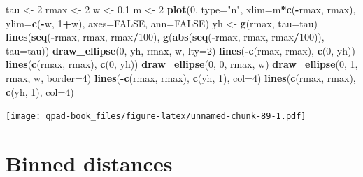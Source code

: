 \documentclass[12pt,]{book}
\newenvironment{Shaded}{\begin{snugshade}}{\end{snugshade}}
\newcommand{\DataTypeTok}[1]{\textcolor[rgb]{0.13,0.29,0.53}{#1}}
\newcommand{\DecValTok}[1]{\textcolor[rgb]{0.00,0.00,0.81}{#1}}
\newcommand{\FloatTok}[1]{\textcolor[rgb]{0.00,0.00,0.81}{#1}}
\newcommand{\KeywordTok}[1]{\textcolor[rgb]{0.13,0.29,0.53}{\textbf{#1}}}
\newcommand{\NormalTok}[1]{#1}
\newcommand{\OperatorTok}[1]{\textcolor[rgb]{0.81,0.36,0.00}{\textbf{#1}}}
\newcommand{\OtherTok}[1]{\textcolor[rgb]{0.56,0.35,0.01}{#1}}
\newcommand{\StringTok}[1]{\textcolor[rgb]{0.31,0.60,0.02}{#1}}
\begin{document}
\begin{Shaded}
\begin{Highlighting}[]
\NormalTok{tau <-}\StringTok{ }\DecValTok{2}
\NormalTok{rmax <-}\StringTok{ }\DecValTok{2}
\NormalTok{w <-}\StringTok{ }\FloatTok{0.1}
\NormalTok{m <-}\StringTok{ }\DecValTok{2}
\KeywordTok{plot}\NormalTok{(}\DecValTok{0}\NormalTok{, }\DataTypeTok{type=}\StringTok{"n"}\NormalTok{, }\DataTypeTok{xlim=}\NormalTok{m}\OperatorTok{*}\KeywordTok{c}\NormalTok{(}\OperatorTok{-}\NormalTok{rmax, rmax), }\DataTypeTok{ylim=}\KeywordTok{c}\NormalTok{(}\OperatorTok{-}\NormalTok{w, }\DecValTok{1}\OperatorTok{+}\NormalTok{w), }
  \DataTypeTok{axes=}\OtherTok{FALSE}\NormalTok{, }\DataTypeTok{ann=}\OtherTok{FALSE}\NormalTok{)}
\NormalTok{yh <-}\StringTok{ }\KeywordTok{g}\NormalTok{(rmax, }\DataTypeTok{tau=}\NormalTok{tau)}
\KeywordTok{lines}\NormalTok{(}\KeywordTok{seq}\NormalTok{(}\OperatorTok{-}\NormalTok{rmax, rmax, rmax}\OperatorTok{/}\DecValTok{100}\NormalTok{),}
  \KeywordTok{g}\NormalTok{(}\KeywordTok{abs}\NormalTok{(}\KeywordTok{seq}\NormalTok{(}\OperatorTok{-}\NormalTok{rmax, rmax, rmax}\OperatorTok{/}\DecValTok{100}\NormalTok{)), }\DataTypeTok{tau=}\NormalTok{tau))}
\KeywordTok{draw_ellipse}\NormalTok{(}\DecValTok{0}\NormalTok{, yh, rmax, w, }\DataTypeTok{lty=}\DecValTok{2}\NormalTok{)}
\KeywordTok{lines}\NormalTok{(}\OperatorTok{-}\KeywordTok{c}\NormalTok{(rmax, rmax), }\KeywordTok{c}\NormalTok{(}\DecValTok{0}\NormalTok{, yh))}
\KeywordTok{lines}\NormalTok{(}\KeywordTok{c}\NormalTok{(rmax, rmax), }\KeywordTok{c}\NormalTok{(}\DecValTok{0}\NormalTok{, yh))}
\KeywordTok{draw_ellipse}\NormalTok{(}\DecValTok{0}\NormalTok{, }\DecValTok{0}\NormalTok{, rmax, w)}
\KeywordTok{draw_ellipse}\NormalTok{(}\DecValTok{0}\NormalTok{, }\DecValTok{1}\NormalTok{, rmax, w, }\DataTypeTok{border=}\DecValTok{4}\NormalTok{)}
\KeywordTok{lines}\NormalTok{(}\OperatorTok{-}\KeywordTok{c}\NormalTok{(rmax, rmax), }\KeywordTok{c}\NormalTok{(yh, }\DecValTok{1}\NormalTok{), }\DataTypeTok{col=}\DecValTok{4}\NormalTok{)}
\KeywordTok{lines}\NormalTok{(}\KeywordTok{c}\NormalTok{(rmax, rmax), }\KeywordTok{c}\NormalTok{(yh, }\DecValTok{1}\NormalTok{), }\DataTypeTok{col=}\DecValTok{4}\NormalTok{)}
\end{Highlighting}
\end{Shaded}

\texttt{[image: qpad-book\_files/figure-latex/unnamed-chunk-89-1.pdf]}

\hypertarget{binned-distances}{%
\section{Binned distances}\label{binned-distances}}
\end{document}
